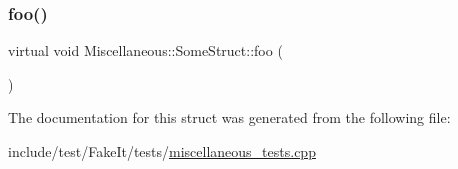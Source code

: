 \subsubsection{\texorpdfstring{foo()}{foo()}}
{\footnotesize\ttfamily virtual void Miscellaneous\+::\+Some\+Struct\+::foo (\begin{DoxyParamCaption}{ }\end{DoxyParamCaption})\hspace{0.3cm}{\ttfamily [pure virtual]}}



The documentation for this struct was generated from the following file\+:\begin{DoxyCompactItemize}
\item 
include/test/\+Fake\+It/tests/\mbox{\hyperlink{miscellaneous__tests_8cpp}{miscellaneous\+\_\+tests.\+cpp}}\end{DoxyCompactItemize}
